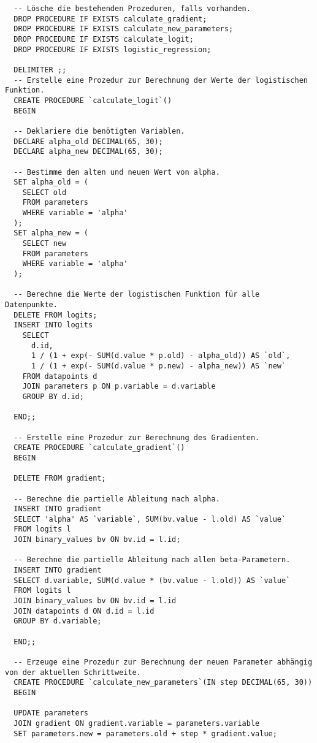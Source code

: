 \begin{verbatim}
  -- Lösche die bestehenden Prozeduren, falls vorhanden.
  DROP PROCEDURE IF EXISTS calculate_gradient;
  DROP PROCEDURE IF EXISTS calculate_new_parameters;
  DROP PROCEDURE IF EXISTS calculate_logit;
  DROP PROCEDURE IF EXISTS logistic_regression;

  DELIMITER ;;
  -- Erstelle eine Prozedur zur Berechnung der Werte der logistischen Funktion.
  CREATE PROCEDURE `calculate_logit`()
  BEGIN

  -- Deklariere die benötigten Variablen.
  DECLARE alpha_old DECIMAL(65, 30);
  DECLARE alpha_new DECIMAL(65, 30);

  -- Bestimme den alten und neuen Wert von alpha.
  SET alpha_old = (
    SELECT old
    FROM parameters
    WHERE variable = 'alpha'
  );
  SET alpha_new = (
    SELECT new
    FROM parameters
    WHERE variable = 'alpha'
  );

  -- Berechne die Werte der logistischen Funktion für alle Datenpunkte.
  DELETE FROM logits;
  INSERT INTO logits
    SELECT
      d.id,
      1 / (1 + exp(- SUM(d.value * p.old) - alpha_old)) AS `old`,
      1 / (1 + exp(- SUM(d.value * p.new) - alpha_new)) AS `new`
    FROM datapoints d
    JOIN parameters p ON p.variable = d.variable
    GROUP BY d.id;

  END;;

  -- Erstelle eine Prozedur zur Berechnung des Gradienten.
  CREATE PROCEDURE `calculate_gradient`()
  BEGIN

  DELETE FROM gradient;

  -- Berechne die partielle Ableitung nach alpha.
  INSERT INTO gradient
  SELECT 'alpha' AS `variable`, SUM(bv.value - l.old) AS `value`
  FROM logits l
  JOIN binary_values bv ON bv.id = l.id;

  -- Berechne die partielle Ableitung nach allen beta-Parametern.
  INSERT INTO gradient
  SELECT d.variable, SUM(d.value * (bv.value - l.old)) AS `value`
  FROM logits l
  JOIN binary_values bv ON bv.id = l.id
  JOIN datapoints d ON d.id = l.id
  GROUP BY d.variable;

  END;;

  -- Erzeuge eine Prozedur zur Berechnung der neuen Parameter abhängig von der aktuellen Schrittweite.
  CREATE PROCEDURE `calculate_new_parameters`(IN step DECIMAL(65, 30))
  BEGIN

  UPDATE parameters
  JOIN gradient ON gradient.variable = parameters.variable
  SET parameters.new = parameters.old + step * gradient.value;


\end{verbatim}

